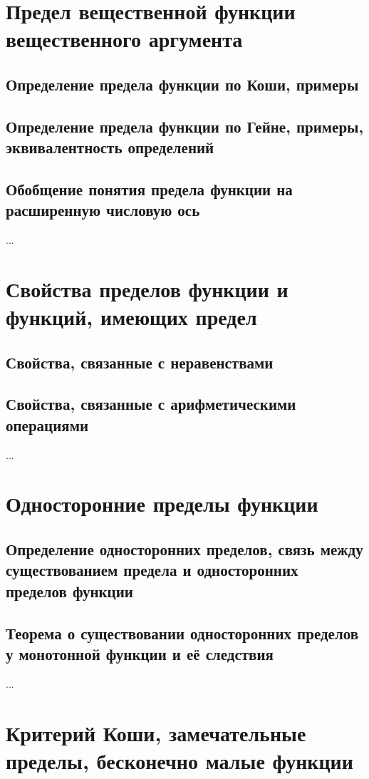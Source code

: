 \section{Предел вещественной функции вещественного аргумента}
\subsection{Определение предела функции по Коши, примеры}
\subsection{Определение предела функции по Гейне, примеры, эквивалентность определений}
\subsection{Обобщение понятия предела функции на расширенную числовую ось}
...

\section{Свойства пределов функции и функций, имеющих предел}
\subsection{Свойства, связанные с неравенствами}
\subsection{Свойства, связанные с арифметическими  операциями}
...

\section{Односторонние пределы функции}
\subsection{Определение односторонних пределов, связь между существованием предела и односторонних пределов функции}
\subsection{Теорема о существовании односторонних пределов у монотонной функции и её следствия}
...

\section{Критерий Коши, замечательные пределы, бесконечно малые функции}

